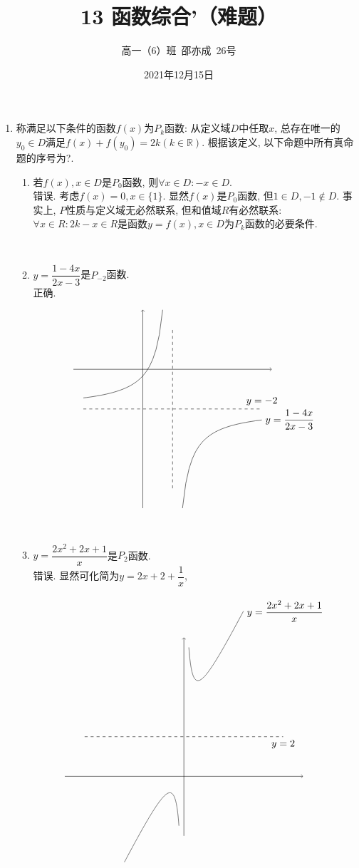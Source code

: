 \documentclass[8pt]{article}
\author{高一（6）班\ 邵亦成\ 26号}
\title{13 函数综合'（难题）}
\date{2021年12月15日}
\begin{document}
	\maketitle

	\begin{enumerate}[label=\arabic*.]
		\item 称满足以下条件的函数$f(x)$为$P_k$函数: 从定义域$D$中任取$x$, 总存在唯一的$y_0 \in D$满足$f(x) + f(y_0) = 2k (k\in\mathbb{R})$. 根据该定义, 以下命题中所有真命题的序号为?.
			\begin{enumerate}[label=(\arabic*)]
				\item 若$f(x), x\in D$是$P_0$函数, 则$\forall x\in D: -x\in D$.
					~\\

					错误. 考虑$f(x)=0, x\in \{1\}.$ 显然$f(x)$是$P_0$函数, 但$1\in D, -1 \notin D$. 事实上, $P$性质与定义域无必然联系, 但和值域$R$有必然联系: $\forall x\in R: 2k-x \in R$是函数$y=f(x), x\in D$为$P_k$函数的必要条件.

				~\\

				\item $y=\dfrac{1-4x}{2x-3}$是$P_{-2}$函数.
					~\\

					正确.

					$$\begin{tikzpicture}[scale=0.7, baseline=0]
			    		\draw[black, ->] (-3.5,  0)--( 6.5,  0);
			    		\draw[black, ->] ( 0, -7)--( 0,  3);
			    		\draw[black, domain=-3:1] plot(\x, {(1-4*\x)/(2*\x-3)});
			    		\draw[black, domain=2:6] plot(\x, {(1-4*\x)/(2*\x-3)}) node[right] {$y=\dfrac{1-4x}{2x-3}$};
			    		\draw[black, dashed] (1.5, -6)--(1.5, 2);
			    		\draw[black, dashed] (-3, -2)--(6, -2) node[above] {$y=-2$};
			    	\end{tikzpicture}
			    	$$

		    	~\\

		    	\item $y=\dfrac{2x^2+2x+1}{x}$是$P_2$函数.
		    		~\\

		    		错误. 显然可化简为$y=2x+2+\dfrac{1}{x}$,

					$$\begin{tikzpicture}[scale=0.7, baseline=0]
			    		\draw[black, ->] (-6,  0)--( 6,  0);
			    		\draw[black, ->] ( 0, -3)--( 0,  7);
			    		\draw[black, domain=-3:-0.25, samples=1000] plot(\x, {2*\x+2+1/\x});
			    		\draw[black, domain=0.25:3, samples=1000] plot(\x, {2*\x+2+1/\x}) node[right] {$y=\dfrac{2x^2+2x+1}{x}$};
			    		\draw[black, dashed] (-5, 2)--(5, 2) node[below] {$y=2$};
			    	\end{tikzpicture}
			    	$$


\end{enumerate}
\end{enumerate}
\end{document}
